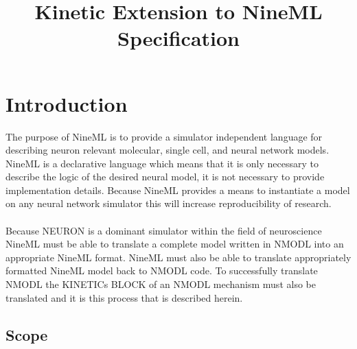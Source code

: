 \documentclass[draftspec]{ninemlspec}
\begin{document}
\title{Kinetic Extension to NineML Specification}

\newpage
\pagestyle{plain}


\section{Introduction}

The purpose of NineML is to provide a simulator independent language for describing neuron relevant molecular, single cell, and neural network models. NineML is a declarative language which means that it is only necessary to describe the logic of the desired neural model, it is not necessary to provide implementation details. Because NineML provides a means to instantiate a model on any neural network simulator this will increase reproducibility of research.\\
\\
Because NEURON is a dominant simulator within the field of neuroscience NineML must be able to translate a complete model written in NMODL into an appropriate NineML format. NineML must also be able to translate appropriately formatted NineML model back to NMODL code. To successfully translate NMODL the KINETICs BLOCK of an NMODL mechanism must also be translated and it is this process that is described herein.







\subsection{Scope}
\end{document}
